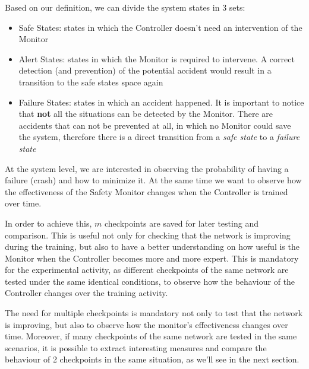 Based on our definition, we can divide the system states in 3 sets:

\begin{itemize}
	\item Safe States: states in which the Controller doesn't need an intervention of the Monitor
	\item Alert States: states in which the Monitor is required to intervene. A correct detection (and prevention) of the potential accident would result in a transition to the safe states space again
	\item Failure States: states in which an accident happened. It is important to notice that \textbf{not} all the situations can be detected by the Monitor. There are accidents that can not be prevented at all, in which no Monitor could save the system, therefore there is a direct transition from a \textsl{safe state} to a \textsl{failure state}
\end{itemize}


At the system level, we are interested in observing the probability of having a failure (crash) and how to minimize it. At the same time we want to observe how the effectiveness of the Safety Monitor changes when the Controller is trained over time.

In order to achieve this, $m$ checkpoints are saved for later testing and comparison. This is useful not only for checking that the network is improving during the training, but also to have a better understanding on how useful is the Monitor when the Controller becomes more and more expert. This is mandatory for the experimental activity, as different checkpoints of the same network are tested under the same identical conditions, to observe how the behaviour of the Controller changes over the training activity.

The need for multiple checkpoints is mandatory not only to test that the network is improving, but also to observe how the monitor's effectiveness changes over time. Moreover, if many checkpoints of the same network are tested in the same scenarios, it is possible to extract interesting measures and compare the behaviour of 2 checkpoints in the same situation, as we'll see in the next section.

